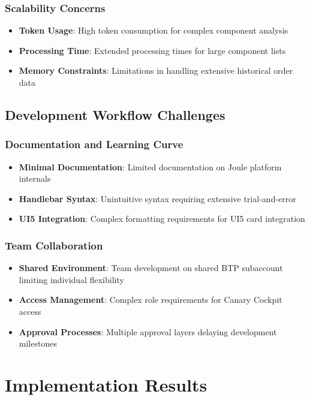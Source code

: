 \subsubsection{Scalability Concerns}
\begin{itemize}
    \item \textbf{Token Usage}: High token consumption for complex component analysis
    \item \textbf{Processing Time}: Extended processing times for large component lists
    \item \textbf{Memory Constraints}: Limitations in handling extensive historical order data
\end{itemize}

\subsection{Development Workflow Challenges}

\subsubsection{Documentation and Learning Curve}
\begin{itemize}
    \item \textbf{Minimal Documentation}: Limited documentation on Joule platform internals
    \item \textbf{Handlebar Syntax}: Unintuitive syntax requiring extensive trial-and-error
    \item \textbf{UI5 Integration}: Complex formatting requirements for UI5 card integration
\end{itemize}

\subsubsection{Team Collaboration}
\begin{itemize}
    \item \textbf{Shared Environment}: Team development on shared BTP subaccount limiting individual flexibility
    \item \textbf{Access Management}: Complex role requirements for Canary Cockpit access
    \item \textbf{Approval Processes}: Multiple approval layers delaying development milestones
\end{itemize}

\section{Implementation Results}

